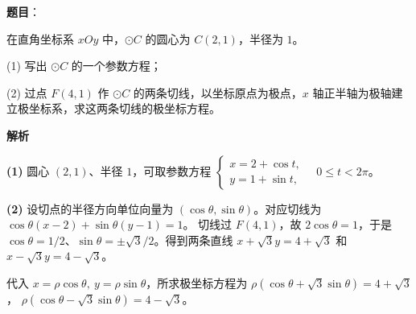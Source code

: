 \begin{answer}

\textbf{题目}：

在直角坐标系 $xOy$ 中，$\odot C$ 的圆心为 $C(2,1)$，半径为 $1$。

  (1) 写出 $\odot C$ 的一个参数方程；

  (2) 过点 $F(4,1)$ 作 $\odot C$ 的两条切线，以坐标原点为极点，$x$ 轴正半轴为极轴建立极坐标系，求这两条切线的极坐标方程。

\textbf{解析}

\textbf{(1)} 圆心 $(2,1)$、半径 $1$，可取参数方程
$\begin{cases}x=2+\cos t,\\y=1+\sin t,\end{cases}\quad 0\leqslant t<2\pi$。

\textbf{(2)} 设切点的半径方向单位向量为 $(\cos\theta,\sin\theta)$。对应切线为
$\cos\theta(x-2)+\sin\theta(y-1)=1$。
切线过 $F(4,1)$，故 $2\cos\theta=1$，于是 $\cos\theta=1/2$、$\sin\theta=\pm\sqrt3/2$。得到两条直线
$x+\sqrt3y=4+\sqrt3$ 和 $x-\sqrt3y=4-\sqrt3$。

代入 $x=\rho\cos\theta,\ y=\rho\sin\theta$，所求极坐标方程为
$\rho(\cos\theta+\sqrt3\sin\theta)=4+\sqrt3$，
$\rho(\cos\theta-\sqrt3\sin\theta)=4-\sqrt3$。



\end{answer}

